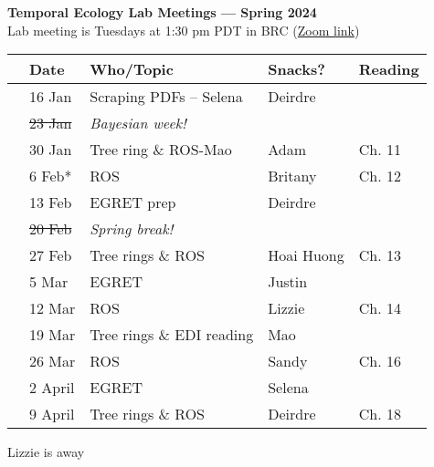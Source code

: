 \documentclass[11pt]{article}
\begin{document}
 
\raggedright
{}

\begin{center} 
{\large \textbf{Temporal Ecology Lab Meetings --- Spring 2024}} \\ [2pt]
Lab meeting is Tuesdays at 1:30 pm PDT in BRC (\href{https://ubc.zoom.us/j/69225274563?pwd=Vmd5NG1QL2h2bTRsQVVTYWJSb0hvQT09}{Zoom link})\\ %
\end{center} 

\begin{center}
\begin{tabular}{ p{0.2 cm}  p{2 cm}  p{5 cm}  p{3 cm}  p{1.5 cm} }  \hline \hline
 & \textbf{Date}
   & \textbf{Who/Topic}
      & \textbf{Snacks?} 
         & \textbf{Reading} \\ 
\hline \hline
&16 Jan & Scraping PDFs -- Selena  &   Deirdre    & \\\hline
 & \sout{23 Jan} & \emph{Bayesian week!} &  &  \\\hline
 & 30 Jan & Tree ring \& ROS-Mao & Adam & Ch. 11 \\\hline  
 & 6 Feb* & ROS & Britany &  Ch. 12  \\\hline
 & 13 Feb  & EGRET prep & Deirdre &  \\\hline 
 & \sout{20 Feb} & \emph{Spring break!}  &  &  \\\hline
 & 27 Feb  & Tree rings \& ROS & Hoai Huong  & Ch. 13\\\hline
 & 5 Mar &  EGRET  & Justin &  \\\hline 
  & 12 Mar  &  ROS & Lizzie &  Ch. 14 \\\hline
 & 19 Mar  & Tree rings  \& EDI reading & Mao & \\\hline
  & 26 Mar  & ROS  & Sandy  & Ch. 16 \\\hline
 &  2 April & EGRET  & Selena &  \\\hline
 & 9 April  & Tree rings  \& ROS & Deirdre & Ch. 18 \\\hline
\hline
\end{tabular}
\end{center}
\noindent *Lizzie is away \\
\end{document}
